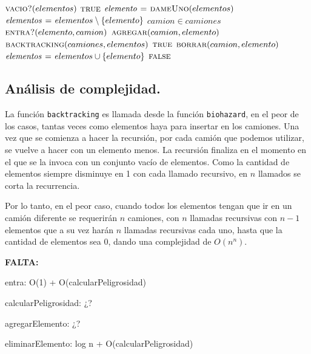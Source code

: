 \vspace*{0.5cm}


\begin{codebox}
\li \If $\textnormal{\scshape vacio?}(elementos)$
\li     \Then
            \Return $\textnormal{\scshape true}$
        \End
\li $\id{elemento} \gets \proc{dameUno}(elementos)$
\li $\id{elementos} \gets elementos \setminus \{elemento\}$
\li \For $camion \in camiones$
\li     \Do
            \If $\textnormal{\scshape entra?}(elemento, camion)$
\li             \Then
                    $\textnormal{\scshape agregar}(camion, elemento)$
\li                 \If $\textnormal{\scshape backtracking}(camiones, elementos)$
                        \Then
\li                         \Return $\textnormal{\scshape true}$
\li                 \Else
\li                     $\textnormal{\scshape borrar}(camion, elemento)$
                    \End
            \End
        \End
\li $\id{elementos} \gets elementos \cup \{elemento\}$
\li \Return $\textnormal{\scshape false}$
\end{codebox}



\newpage
\subsection{Análisis de complejidad.}

\vspace*{0.3cm}


La función \verb|backtracking| es llamada desde la función \verb|biohazard|, en
el peor de los casos, tantas veces como elementos haya para insertar en los camiones.
Una vez que se comienza a hacer la recursión, por cada camión que podemos utilizar,
se vuelve a hacer con un elemento menos. La recursión finaliza en el momento en
el que se la invoca con un conjunto vacío de elementos. Como la cantidad de
elementos siempre disminuye en 1 con cada llamado recursivo, en $n$ llamados se
corta la recurrencia.

Por lo tanto, en el peor caso, cuando todos los elementos tengan que ir en un
camión diferente se requerirán $n$ camiones, con $n$ llamadas recursivas con
$n - 1$ elementos que a su vez harán $n$ llamadas recursivas cada uno, hasta que
la cantidad de elementos sea 0, dando una complejidad de $O(n^n)$.

\textbf{FALTA:}

entra: O(1) + O(calcularPeligrosidad)

calcularPeligrosidad: ¿?

agregarElemento: ¿?

eliminarElemento: log n + O(calcularPeligrosidad)

